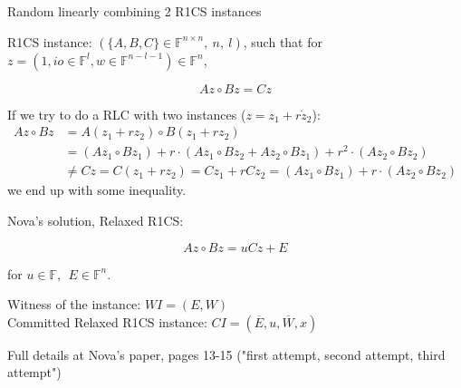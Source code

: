 \documentclass[t]{beamer} \usefonttheme[onlymath]{serif}
\begin{document}
\begin{frame}{Random linearly combining 2 R1CS instances}
  \scriptsize{

    R1CS instance: $(\{A, B, C\} \in \mathbb{F}^{n \times n},~ n,~ l)$, such that for $z=(1, io \in \mathbb{F}^l, w \in \mathbb{F}^{n-l-1}) \in \mathbb{F}^n$,

    $$Az \circ Bz = Cz$$


      If we try to do a RLC with two instances ($z = z_1 + r \dot z_2$):
      \begin{align*}
        Az \circ Bz &= A(z_1 + r z_2) \circ B(z_1 + r z_2)\\
        &= (Az_1 \circ Bz_1) + r \cdot (A z_1 \circ B z_2 + A z_2 \circ B z_1) + r^2 \cdot (A z_2 \circ B z_2)\\
        &\neq C z = C(z_1 + r z_2) = C z_1 + r C z_2 = (A z_1 \circ B z_1) + r \cdot (A z_2 \circ B z_2)
      \end{align*}
      we end up with some inequality.


    \pause

    Nova's solution, Relaxed R1CS:

    $$Az \circ Bz = uCz + E$$

    for $u \in \mathbb{F},~~ E \in \mathbb{F}^n$.

    \vspace{0.5cm}

    Witness of the instance: $WI=(E, W)$\\
    Committed Relaxed R1CS instance: $CI = (\overline{E}, u, \overline{W}, x)$
  }

  \vspace{0.3cm}
  \tiny{Full details at Nova's paper, pages 13-15 ("first attempt, second attempt, third attempt")}

\end{frame}
\end{document}
